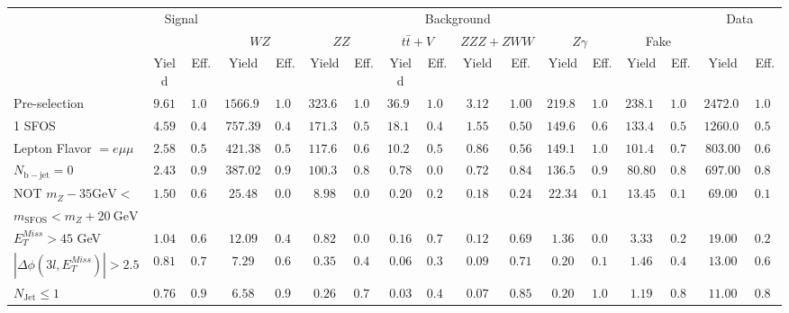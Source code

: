 \begin{tabular}{l||c|c||c|c||c|c||c|c||c|c||c|c||c|c||c|c}
\hline
 &                 \multicolumn{2}{c||}{Signal}            &  \multicolumn{12}{c||}{Background} &  \multicolumn{2}{c}{Data} \\
 & &  & \multicolumn{2}{c||}{$WZ$} & \multicolumn{2}{c||}{$ZZ$} & \multicolumn{2}{c||}{$t\bar{t}+V$} & \multicolumn{2}{c||}{$ZZZ+ZWW$} & \multicolumn{2}{c||}{$Z\gamma$} & \multicolumn{2}{c||}{Fake} &  & \\ 
 & Yield & Eff. & Yield & Eff. & Yield & Eff. & Yield & Eff. & Yield & Eff. & Yield & Eff. & Yield & Eff. & Yield & Eff.\\
\hline\hline
Pre-selection &  $9.61$ &  $1.00$ &  $1566.90$ &  $1.00$ &  $323.60$ &  $1.00$ &  $36.93$ &  $1.00$ &  $3.12$ &  $1.00$ &  $219.80$ &  $1.00$ &  $238.12$ &  $1.00$ &  $2472.00$ &  $1.00$\\ 
\hline
1 SFOS &  $4.59$ &  $0.48$ &  $757.39$ &  $0.48$ &  $171.38$ &  $0.53$ &  $18.10$ &  $0.49$ &  $1.55$ &  $0.50$ &  $149.60$ &  $0.68$ &  $133.47$ &  $0.56$ &  $1260.00$ &  $0.51$\\ 
\hline
Lepton Flavor $= e\mu\mu$ &  $2.58$ &  $0.56$ &  $421.38$ &  $0.56$ &  $117.67$ &  $0.69$ &  $10.20$ &  $0.56$ &  $0.86$ &  $0.56$ &  $149.13$ &  $1.00$ &  $101.43$ &  $0.76$ &  $803.00$ &  $0.64$\\ 
\hline
$N_{\mathrm{b-jet}} = 0$ &  $2.43$ &  $0.94$ &  $387.02$ &  $0.92$ &  $100.30$ &  $0.85$ &  $0.78$ &  $0.08$ &  $0.72$ &  $0.84$ &  $136.50$ &  $0.92$ &  $80.80$ &  $0.80$ &  $697.00$ &  $0.87$\\ 
\hline
NOT $m_Z - 35 \mathrm{GeV} <$   & \multirow{2}{*}{$1.50$} &  \multirow{2}{*}{$0.62$} &  \multirow{2}{*}{$25.48$} &  \multirow{2}{*}{$0.07$} &  \multirow{2}{*}{$8.98$} &  \multirow{2}{*}{$0.09$} &  \multirow{2}{*}{$0.20$} &  \multirow{2}{*}{$0.26$} &  \multirow{2}{*}{$0.18$} &  \multirow{2}{*}{$0.24$} &  \multirow{2}{*}{$22.34$} &  \multirow{2}{*}{$0.16$} &  \multirow{2}{*}{$13.45$} &  \multirow{2}{*}{$0.17$} &  \multirow{2}{*}{$69.00$} &  \multirow{2}{*}{$0.10$}\\ 
$ m_{\mathrm{SFOS}} < m_Z + 20~\mathrm{GeV}$  & & & & & & & & & & & & & &  & \\
\hline
$E_{T}^{Miss} > 45$ GeV &  $1.04$ &  $0.69$ &  $12.09$ &  $0.47$ &  $0.82$ &  $0.09$ &  $0.16$ &  $0.77$ &  $0.12$ &  $0.69$ &  $1.36$ &  $0.06$ &  $3.33$ &  $0.25$ &  $19.00$ &  $0.28$\\ 
\hline
$|\Delta\phi(3l,E_{T}^{Miss})| > 2.5$ &  $0.81$ &  $0.78$ &  $7.29$ &  $0.60$ &  $0.35$ &  $0.42$ &  $0.06$ &  $0.39$ &  $0.09$ &  $0.71$ &  $0.20$ &  $0.15$ &  $1.46$ &  $0.44$ &  $13.00$ &  $0.68$\\ 
\hline
$N_{\mathrm{Jet}} \leq 1$ &  $0.76$ &  $0.94$ &  $6.58$ &  $0.90$ &  $0.26$ &  $0.75$ &  $0.03$ &  $0.49$ &  $0.07$ &  $0.85$ &  $0.20$ &  $1.00$ &  $1.19$ &  $0.82$ &  $11.00$ &  $0.85$\\ 
\hline
\end{tabular}
